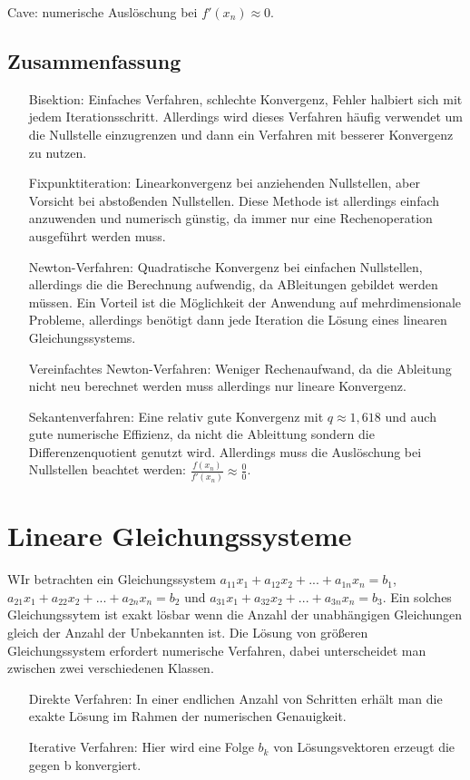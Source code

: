 \documentclass{scrartcl}
\begin{document}
Cave: numerische Auslöschung bei $f'(x_n) \approx 0$.

\subsection{Zusammenfassung}
\begin{itemize}
\item[Bisektion:] Einfaches Verfahren, schlechte Konvergenz, Fehler halbiert sich mit jedem Iterationsschritt.
Allerdings wird dieses Verfahren häufig verwendet um die Nullstelle einzugrenzen und dann ein Verfahren mit besserer Konvergenz zu nutzen.
\item[Fixpunktiteration:]Linearkonvergenz bei anziehenden Nullstellen, aber Vorsicht bei abstoßenden Nullstellen.
Diese Methode ist allerdings einfach anzuwenden und numerisch günstig, da immer nur eine Rechenoperation ausgeführt werden muss.
\item[Newton-Verfahren:] Quadratische Konvergenz bei einfachen Nullstellen, allerdings die die Berechnung aufwendig, da ABleitungen gebildet werden müssen.
Ein Vorteil ist die Möglichkeit der Anwendung auf mehrdimensionale Probleme, allerdings benötigt dann jede Iteration die Lösung eines linearen Gleichungssystems.
\item[Vereinfachtes Newton-Verfahren:]Weniger Rechenaufwand, da die Ableitung nicht neu berechnet werden muss allerdings nur lineare Konvergenz.
\item[Sekantenverfahren:] Eine relativ gute Konvergenz mit $q\approx 1,618$ und auch gute numerische Effizienz, da nicht die Ableittung sondern die Differenzenquotient genutzt wird. Allerdings muss die Auslöschung bei Nullstellen beachtet werden: $\frac{f(x_n)}{f'(x_n)} \approx \frac{0}{0}$.
\end{itemize}

\section{Lineare Gleichungssysteme}
WIr betrachten ein Gleichungssystem $a_{11} x_1+a_{12} x_2+...+a_{1n} x_n=b_1$, $a_{21} x_1+a_{22} x_2+...+a_{2n} x_n=b_2$ und $a_{31} x_1+a_{32} x_2+...+a_{3n} x_n=b_3$. Ein solches Gleichungssytem ist exakt lösbar wenn die Anzahl der unabhängigen Gleichungen gleich der Anzahl der Unbekannten ist. 
Die Lösung von größeren Gleichungssystem erfordert numerische Verfahren, dabei unterscheidet man zwischen zwei verschiedenen Klassen.
\begin{itemize}
\item[Direkte Verfahren:] In einer endlichen Anzahl von Schritten erhält man die exakte Lösung im Rahmen der numerischen Genauigkeit.
\item[Iterative Verfahren:] Hier wird eine Folge $b_k$ von Lösungsvektoren erzeugt die gegen b konvergiert.
\end{itemize}
\end{document}
